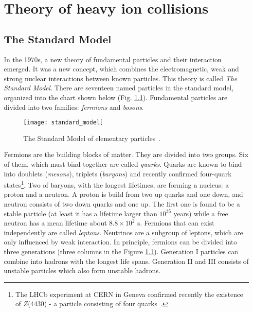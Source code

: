 \chapter{Theory of heavy ion collisions}
  \section{The Standard Model}
    In the 1970s, a new theory of fundamental particles and their interaction emerged.
    It was a new concept, which combines the electromagnetic, weak and strong nuclear interactions between known particles.
    This theory is called \textit{The Standard Model}.
    There are seventeen named particles in the standard model, organized into the chart shown below (Fig. \ref{fig:standard_model}).
    Fundamental particles are divided into two families: \textit{fermions} and \textit{bosons}.
     \begin{figure}[h]
       \centering
       \texttt{[image: standard\_model]}
       \caption{The Standard Model of elementary particles~\cite{sm_svg}.}
       \label{fig:standard_model}
     \end{figure}
     
    Fermions are the building blocks of matter.
    They are divided into two groups.
    Six of them, which must bind together are called \textit{quarks}.
    Quarks are known to bind into doublets (\textit{mesons}), triplets (\textit{baryons}) and recently confirmed four-quark states\footnote{The LHCb experiment at CERN in Geneva confirmed recently the existence of $Z$(4430) - a particle consisting of four quarks~\cite{fourquark}.}.
    Two of baryons, with the longest lifetimes, are forming a nucleus: a proton and a neutron.
    A proton is build from two up quarks and one down, and neutron consists of two down quarks and one up.
    The first one is found to be a stable particle (at least it has a lifetime larger than $10^{35}$ years) while a free neutron has a mean lifetime about $8.8\times10^2$ s.
    Fermions that can exist independently are called \textit{leptons}.
    Neutrinos are a subgroup of leptons, which are only influenced by weak interaction.
    In principle, fermions can be divided into three generations (three columns in the Figure \ref{fig:standard_model}).
    Generation I particles can combine into hadrons with the longest life spans. 
    Generation II and III consists of unstable particles which also form unstable hadrons. 
    
